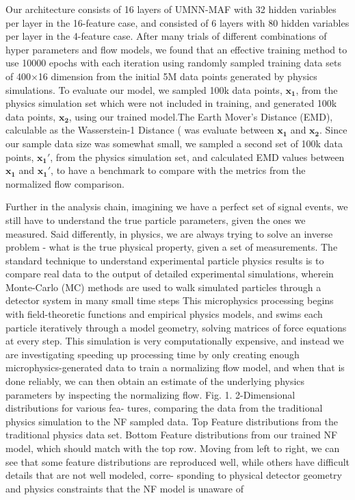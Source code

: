 Our architecture consists of 16 layers of UMNN-MAF with 32 hidden variables per layer in the 16-feature case, and consisted of 6 layers with 80 hidden variables per layer in the 4-feature case. After many trials of different combinations of hyper parameters and flow models, we found that an effective training method to use 10000 epochs with each iteration using randomly sampled training data sets of 400$\times$16 dimension from the initial 5M data points generated by physics simulations. To evaluate our model, we sampled 100k data points, $\mathbf{x_1}$, from the physics simulation set which were not included in training, and generated 100k data points, $\mathbf{x_2}$, using our trained model.The Earth Mover's Distance (EMD), calculable as the Wasserstein-1 Distance (\cite{Dobrushin1970PrescribingDistributions} was evaluate between $\mathbf{x_1}$ and $\mathbf{x_2}$. Since our sample data size was somewhat small, we sampled a second set of 100k data points, $\mathbf{x_1'}$, from the physics simulation set, and calculated EMD values between  $\mathbf{x_1}$ and $\mathbf{x_1'}$, to have a benchmark to compare with the metrics from the normalized flow comparison.



Further in the analysis chain, imagining we have a perfect set of signal events, we still have to understand the true particle
parameters, given the ones we measured. Said differently, in physics, we are always trying to solve an inverse problem - what
is the true physical property, given a set of measurements. The standard technique to understand experimental particle physics
results is to compare real data to the output of detailed experimental simulations, wherein Monte-Carlo (MC) methods are
used to walk simulated particles through a detector system in many small time steps This microphysics processing begins with
field-theoretic functions and empirical physics models, and swims each particle iteratively through a model geometry, solving
matrices of force equations at every step. This simulation is very computationally expensive, and instead we are investigating
speeding up processing time by only creating enough microphysics-generated data to train a normalizing flow model, and when
that is done reliably, we can then obtain an estimate of the underlying physics parameters by inspecting the normalizing flow.
Fig. 1. 2-Dimensional distributions for various fea-
tures, comparing the data from the traditional physics
simulation to the NF sampled data. Top Feature
distributions from the traditional physics data set.
Bottom Feature distributions from our trained NF
model, which should match with the top row. Moving
from left to right, we can see that some feature
distributions are reproduced well, while others have
difficult details that are not well modeled, corre-
sponding to physical detector geometry and physics
constraints that the NF model is unaware of


